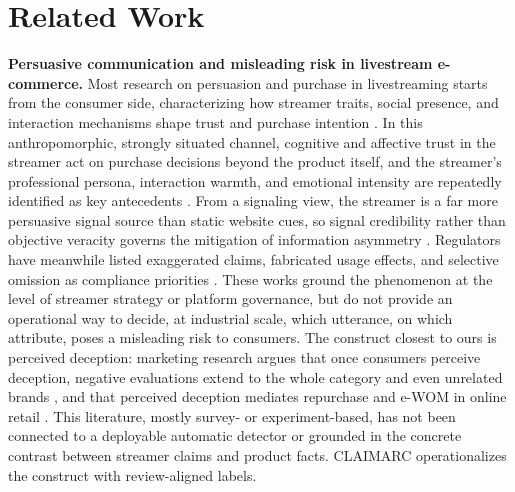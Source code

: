 \documentclass[letterpaper]{article}
\begin{document}
\section{Related Work}

\textbf{Persuasive communication and misleading risk in livestream e-commerce.} Most research on persuasion and purchase in livestreaming starts from the consumer side, characterizing how streamer traits, social presence, and interaction mechanisms shape trust and purchase intention \citep{wongkitrungrueng2020livestream,sun2019livestream,park2020internetcelebrity}. In this anthropomorphic, strongly situated channel, cognitive and affective trust in the streamer act on purchase decisions beyond the product itself, and the streamer's professional persona, interaction warmth, and emotional intensity are repeatedly identified as key antecedents \citep{lu2021livestream,hu2020livestream}. From a signaling view, the streamer is a far more persuasive signal source than static website cues, so signal credibility rather than objective veracity governs the mitigation of information asymmetry \citep{mavlanova2012signaling}. Regulators have meanwhile listed exaggerated claims, fabricated usage effects, and selective omission as compliance priorities \citep{samr2025livestream}. These works ground the phenomenon at the level of streamer strategy or platform governance, but do not provide an operational way to decide, at industrial scale, which utterance, on which attribute, poses a misleading risk to consumers. The construct closest to ours is perceived deception: marketing research argues that once consumers perceive deception, negative evaluations extend to the whole category and even unrelated brands \citep{agakhani2019brand}, and that perceived deception mediates repurchase and e-WOM in online retail \citep{riquelme2014perceived}. This literature, mostly survey- or experiment-based, has not been connected to a deployable automatic detector or grounded in the concrete contrast between streamer claims and product facts. CLAIMARC operationalizes the construct with review-aligned labels.
\end{document}
